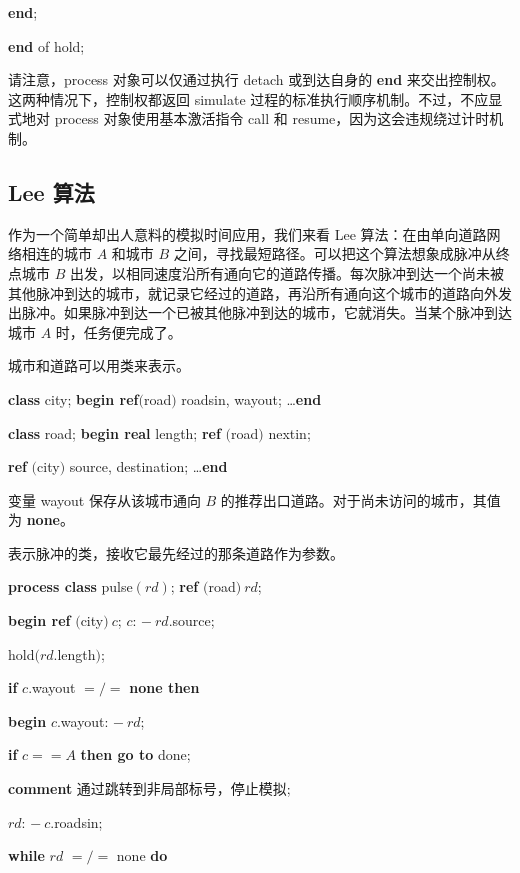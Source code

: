 \quad \quad \textbf{end};

\quad \textbf{end} of hold;

\noindent
请注意，process 对象可以仅通过执行 detach 或到达自身的 \textbf{end} 来交出控制权。这两种情况下，控制权都返回 simulate 过程的标准执行顺序机制。不过，不应显式地对 process 对象使用基本激活指令 call 和 resume，因为这会违规绕过计时机制。

\subsection{Lee 算法}

作为一个简单却出人意料的模拟时间应用，我们来看 Lee 算法：在由单向道路网络相连的城市 $A$ 和城市 $B$ 之间，寻找最短路径。可以把这个算法想象成脉冲从终点城市 $B$ 出发，以相同速度沿所有通向它的道路传播。每次脉冲到达一个尚未被其他脉冲到达的城市，就记录它经过的道路，再沿所有通向这个城市的道路向外发出脉冲。如果脉冲到达一个已被其他脉冲到达的城市，它就消失。当某个脉冲到达城市 $A$ 时，任务便完成了。

城市和道路可以用类来表示。

\quad \textbf{class} city; \textbf{begin ref}$($road$)$ roadsin, wayout; \dots \textbf{end}

\quad \textbf{class} road; \textbf{begin real} length; \textbf{ref} $($road$)$ nextin;

\quad \quad \textbf{ref} $($city$)$ source, destination; \dots \textbf{end}

\noindent
变量 wayout 保存从该城市通向 $B$ 的推荐出口道路。对于尚未访问的城市，其值为 \textbf{none}。

表示脉冲的类，接收它最先经过的那条道路作为参数。

\quad \textbf{process class} pulse$(rd)$; \textbf{ref} $($road$)\ rd$;

\quad \textbf{begin ref} $($city$)\ c$; $c$: $-\ rd$.source;

\quad \quad hold$(rd$.length$)$;

\quad \quad \textbf{if} $c$.wayout $=/=$ \textbf{none then}

\quad \quad \textbf{begin} $c$.wayout: $-\ rd$;

\quad \quad \quad \textbf{if} $c == A$ \textbf{then go to} done;

\quad \quad \quad \textbf{comment} 通过跳转到非局部标号，停止模拟;

\quad \quad \quad $rd$: $-\ c$.roadsin;

\quad \quad \quad \textbf{while} $rd$ $=/=$ none \textbf{do}

